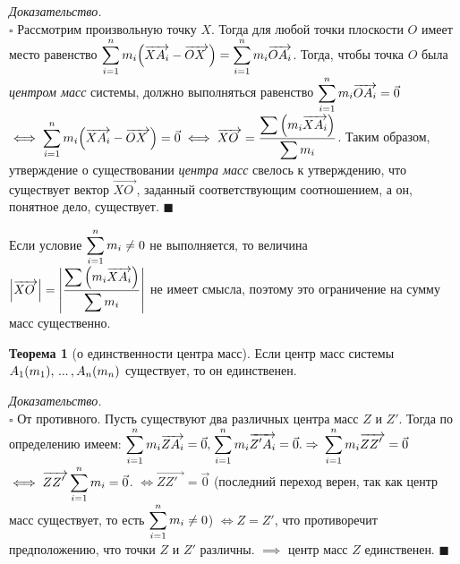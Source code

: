\documentclass[14pt]{extarticle}
\let\vecarrow\overrightarrow
\theoremstyle{definition}
\theoremstyle{theorem}
\newtheorem*{theorem}{Теорема}
\renewenvironment{proof}
    {\noindent \textit{Доказательство.}\\
	\indent $\square$}
	{ $\blacksquare$\\ }
\newenvironment{note}
    {\noindent {\normalfont\fontsize{14}{14}\textbf{\textit{Примечание.}}}}
\DeclarePairedDelimiter\abs{\lvert}{\rvert}
\begin{document}
{
\begin{proof}
    Рассмотрим произвольную точку $X$. Тогда для любой  точки
	плоскости $O$ имеет место равенство $\mathlarger{\sum_{i=1}^{n}
	m_i  \Big(\vecarrow{XA_i} - \vecarrow{OX_{\, \,}}\Big) = \sum_{i=1}^{n} 
	m_i  \vecarrow{OA_i}}$. Тогда, чтобы точка $O$ была 
	\textit{центром масс} системы, должно выполняться равенство
	$\mathlarger{\sum_{i=1}^{n} 
	m_i  \vecarrow{OA_i}} = \vec{0}$ $\iff \mathlarger{\sum_{i=1}^{n} m_i 
	\Big(\vecarrow{XA_i} - \vecarrow{OX_{\, \,}}\Big) = \vec{0} \iff 
    \vecarrow{XO_{\;}} = \frac{\displaystyle \sum \Big(m_i
	\vecarrow{XA_i} \Big)}{\displaystyle\sum m_i}}$. Таким образом, %
    утверждение о существовании \textit{центра масс} свелось к утверждению, что существует
	вектор $\vecarrow{XO_{\;}}$, заданный соответствующим соотношением, а он,
	понятное дело, существует.
\end{proof}
\par}

\begin{note}
	{
    Если условие $\mathlarger{\sum_{i=1}^{n} m_i \ne 0}$ не выполняется,
	то величина \\
	$\mathlarger{\abs*{\vecarrow{XO_{\;}}} = \abs*{\frac{\displaystyle
    \sum \Big(m_i
	\vecarrow{XA_i} \Big)}{\displaystyle \sum m_i}}}$  не имеет смысла,
    поэтому это ограничение на сумму  масс существенно.\par
    }
\end{note}

\begin{theorem}[о единственности центра масс]
    Если центр масс системы $A_1(m_1), \\  \, ... \, ,A_n(m_n)$
	существует, то он единственен.
\end{theorem}

\begin{proof}
От противного. Пусть существуют два различных центра масс $Z$ и $Z'$.
Тогда по определению имеем: $\mathlarger{\sum_{i=1}^{n} m_i  \vecarrow{ZA_i}
= \vec{0},} \;  \mathlarger{\sum_{i=1}^{n} m_i  \vecarrow{Z'A_i}} = \vec{0}. 
\Rightarrow$ $\mathlarger{\sum_{i=1}^{n} m_i  \vecarrow{ZZ'_{\;\:\,}}} = \vec{0}$
$\iff \mathlarger{\vecarrow{ZZ'_{\;\:\,}} \sum_{i=1}^{n} m_i} = \vec{0}$. 
$\iff \vecarrow{ZZ'_{\;\:\,}} = \vec{0}$ (последний переход верен, 
так как центр масс существует, то есть
$\mathlarger{\sum_{i=1}^{n} m_i \ne 0}$) $\iff Z = Z'$, что противоречит
предположению, что точки $Z$ и $Z'$ различны. $\implies$ центр масс $Z$
единственен.
\end{proof}
\end{document}
